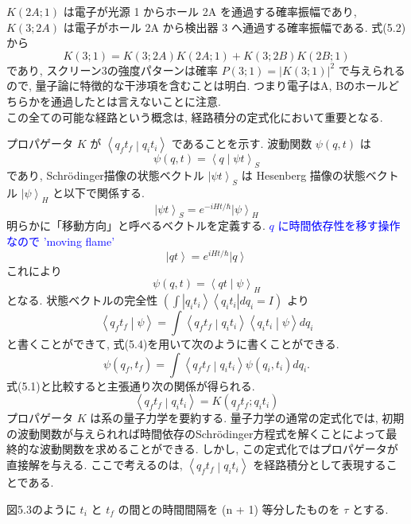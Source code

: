\documentclass{jsarticle}
\newcommand{\bra}[1]{\left\langle #1\right|}
\newcommand{\ket}[1]{\left|#1\right\rangle}
\newcommand{\braket}[2]{\left\langle #1\middle|#2\right\rangle}
\begin{document}
$K(2A; 1)$ は電子が光源 1 からホール 2A を通過する確率振幅であり, $K(3; 2A)$ は電子がホール 2A から検出器 3 へ通過する確率振幅である. 式(5.2)から
\begin{equation*}
    K(3; 1) = K(3; 2A)K(2A; 1) + K(3; 2B)K(2B; 1)
\end{equation*}
であり, スクリーン3の強度パターンは確率 $P(3; 1) = |K(3; 1)|^2$ で与えられるので, 量子論に特徴的な干渉項を含むことは明白. つまり電子はA, Bのホールどちらかを通過したとは言えないことに注意.\\
この全ての可能な経路という概念は, 経路積分の定式化において重要となる.\par
プロパゲータ $K$ が $\braket{q_{f}t_{f}}{q_{i}t_{i}}$ であることを示す. 波動関数 $\psi(q, t)$ は\\
\begin{equation*}
    \psi(q, t) = \braket{q}{\psi t}_{S}
\end{equation*}
であり, Schr\"{o}dinger描像の状態ベクトル $\ket{\psi t}_{S}$ は Hesenberg 描像の状態ベクトル $\ket{\psi}_{H}$ と以下で関係する.
\begin{equation*}
    \ket{\psi t}_{S} = e^{-iHt/\hbar}\ket{\psi}_{H}
\end{equation*}
明らかに「移動方向」と呼べるベクトルを定義する. \textcolor{blue}{$q$ に時間依存性を移す操作なので 'moving flame'}
\begin{equation*}
    \ket{qt} = e^{iHt/\hbar}\ket{q} \tag{5.3}
\end{equation*}
これにより
\begin{equation*}
    \psi(q, t) = \braket{qt}{\psi}_{H} \tag{5.4}
\end{equation*}
となる. 状態ベクトルの完全性 $\displaystyle \left( \int \ket{q_i t_i}\bra{q_i t_i}dq_i = I \right) $ より
\begin{equation*}
    \braket{q_{f}t_{f}}{\psi} = \int \braket{q_{f}t_{f}}{q_{i}t_{i}}\braket{q_{i}t_{i}}{\psi}dq_{i}
\end{equation*}
と書くことができて, 式(5.4)を用いて次のように書くことができる.
\begin{equation*}
    \psi(q_{f}, t_{f}) = \int \braket{q_{f}t_{f}}{q_{i}t_{i}}\psi(q_{i}, t_{i})dq_{i}.
\end{equation*}
式(5.1)と比較すると主張通り次の関係が得られる.
\begin{equation*}
    \braket{q_{f}t_{f}}{q_{i}t_{i}} = K(q_{f}t_{f}; q_{i}t_{i}) \tag{5.5}
\end{equation*}
プロパゲータ $K$ は系の量子力学を要約する. 量子力学の通常の定式化では, 初期の波動関数が与えられれば時間依存のSchr\"{o}dinger方程式を解くことによって最終的な波動関数を求めることができる. しかし, この定式化ではプロパゲータが直接解を与える. ここで考えるのは, $\braket{q_{f}t_{f}}{q_{i}t_{i}}$ を経路積分として表現することである.\par
図5.3のように $t_{i}$ と $t_{f}$ の間との時間間隔を (n + 1) 等分したものを $\tau$ とする.
\end{document}
